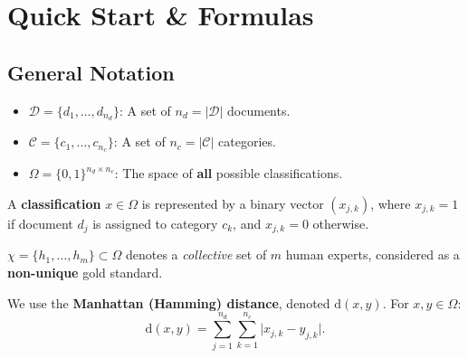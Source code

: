 \documentclass[12pt]{article}
\begin{document}
\begin{abstract}
\textbf{Interpretation:}\\
RFR provides a transparent acceptance criterion aligned with safety-first deployment: accept an AI only when its disagreement pattern remains within empirically observed expert variability at a clinically pre-specified human quantile. Consensus-percentile reporting complements this binary decision with an interpretable continuous score. The approach complements training-time robustness methods, supports ablations, and opens the path to evaluating richer text structuring targets (e.g., FHIR-like forms) by substituting Hamming with semantics-aware distances. Given the stakes, variability-aware acceptance testing of this kind should be integrated into pre-deployment evaluation of AI text classifiers that can affect patient care.
\end{abstract}


\newpage
\tableofcontents
\newpage

\section{Quick Start \& Formulas}
\subsection{General Notation}
\begin{itemize}
    \item $\mathcal{D} = \{d_1, \dots, d_{n_d}\}$: A set of $n_d=|\mathcal{D}|$ documents.
    \item $\mathcal{C} = \{c_1, \dots, c_{n_c}\}$: A set of $n_c=|\mathcal{C}|$ categories.
    \item $\Omega = \{0,1\}^{n_d \times n_c}$: The space of \textbf{all} possible classifications.
\end{itemize}

A \textbf{classification} $x \in \Omega$ is represented by a binary vector $(x_{j,k})$, where $x_{j,k} = 1$ if document $d_j$ is assigned to category $c_k$, and $x_{j,k} = 0$ otherwise.

\noindent $\chi = \{h_1, \dots, h_m\} \subset \Omega$ denotes a \textit{collective} set of $m$ human experts, considered as a \textbf{non-unique} gold standard.

\noindent We use the \textbf{Manhattan (Hamming) distance}, denoted $\mathrm{d}(x,y)$. For $x,y \in \Omega$:
\begin{equation}
\mathrm{d}(x,y) = \sum_{j=1}^{n_d} \sum_{k=1}^{n_c} \bigl|x_{j,k} - y_{j,k}\bigr|.
\end{equation}
\end{document}
